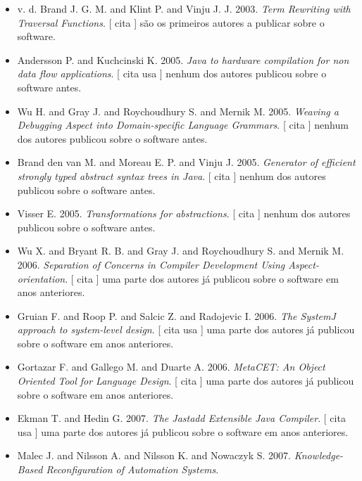 \begin{itemize}
\item v. d. Brand J. G. M. and Klint P. and Vinju J. J.
      2003.
        \textit{ Term Rewriting with Traversal Functions}.
      [
          cita
      ]
são os primeiros autores a publicar sobre o software.
\item Andersson P. and Kuchcinski K.
      2005.
        \textit{ Java to hardware compilation for non data flow applications}.
      [
          cita
          usa
      ]
nenhum dos autores publicou sobre o software antes.
\item Wu H. and Gray J. and Roychoudhury S. and Mernik M.
      2005.
        \textit{ Weaving a Debugging Aspect into Domain-specific Language Grammars}.
      [
          cita
      ]
nenhum dos autores publicou sobre o software antes.
\item Brand den van M. and Moreau E. P. and Vinju J.
      2005.
        \textit{ Generator of efficient strongly typed abstract syntax trees in Java}.
      [
          cita
      ]
nenhum dos autores publicou sobre o software antes.
\item Visser E.
      2005.
        \textit{ Transformations for abstractions}.
      [
          cita
      ]
nenhum dos autores publicou sobre o software antes.
\item Wu X. and Bryant R. B. and Gray J. and Roychoudhury S. and Mernik M.
      2006.
        \textit{ Separation of Concerns in Compiler Development Using Aspect-orientation}.
      [
          cita
      ]
uma parte dos autores já publicou sobre o software em anos anteriores.
\item Gruian F. and Roop P. and Salcic Z. and Radojevic I.
      2006.
        \textit{ The SystemJ approach to system-level design}.
      [
          cita
          usa
      ]
uma parte dos autores já publicou sobre o software em anos anteriores.
\item Gortazar F. and Gallego M. and Duarte A.
      2006.
        \textit{ MetaCET: An Object Oriented Tool for Language Design}.
      [
          cita
      ]
uma parte dos autores já publicou sobre o software em anos anteriores.
\item Ekman T. and Hedin G.
      2007.
        \textit{ The Jastadd Extensible Java Compiler}.
      [
          cita
          usa
      ]
uma parte dos autores já publicou sobre o software em anos anteriores.
\item Malec J. and Nilsson A. and Nilsson K. and Nowaczyk S.
      2007.
        \textit{ Knowledge-Based Reconfiguration of Automation Systems}.

\end{itemize}

